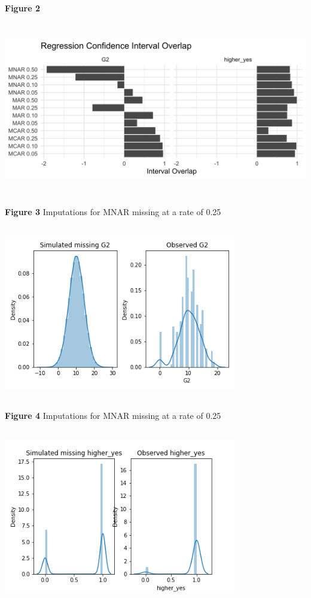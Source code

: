 \documentclass[11pt]{article}
\begin{document}
\textbf{Figure 2}

\includegraphics[width=6.5in, height=3in]{credible-interval-overlap-1}

\textbf{Figure 3} Imputations for MNAR missing at a rate of 0.25

\includegraphics[width=4in, height=3in]{MNAR_0.25_G2}

\textbf{Figure 4} Imputations for MNAR missing at a rate of 0.25

\includegraphics[width=4in, height=3in]{MNAR_0.25_higher_yes}
\end{document}
